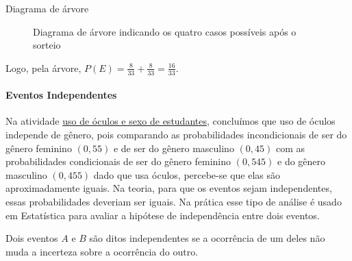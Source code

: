 \begin{example} {Diagrama de árvore}
\begin{figure}[H]
\caption{Diagrama de árvore indicando os quatro casos possíveis após o sorteio}
\label{arvore3}
\end{figure}

Logo, pela árvore, \(\displaystyle P(E)=\frac{8}{33}+\frac{8}{33}=\frac{16}{33}\).
\end{example}


\paragraph{Eventos Independentes}

Na atividade \hyperref[uso-oculos]{uso de óculos e sexo de estudantes}, concluímos que uso de óculos independe de gênero, pois  comparando as probabilidades incondicionais de ser do gênero feminino $(0{,}55)$ e de ser do gênero masculino $(0{,}45)$ com as probabilidades condicionais de ser do gênero feminino $(0{,}545)$ e do gênero masculino $(0{,}455)$ dado que usa óculos, percebe-se que elas são aproximadamente iguais. Na teoria, para que os eventos sejam independentes, essas probabilidades deveriam ser iguais. Na prática esse tipo de análise é usado em Estatística para avaliar a hipótese de independência entre dois eventos.
\begin{observation}{}
Dois eventos \(A\) e \(B\) são ditos independentes se a ocorrência de um deles não muda a incerteza sobre a ocorrência do outro.
\end{observation}


